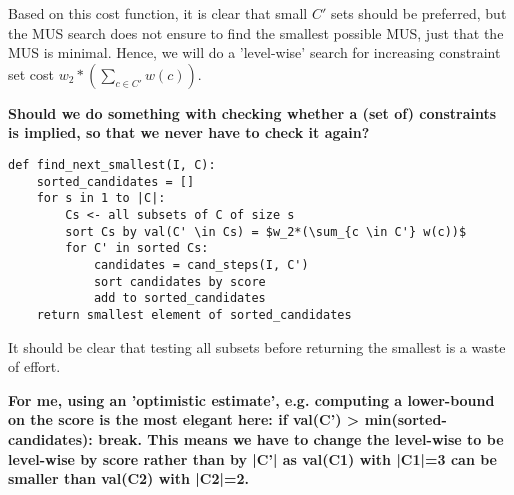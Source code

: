 Based on this cost function, it is clear that small $C'$ sets should be preferred, but the MUS search does not ensure to find the smallest possible MUS, just that the MUS is minimal. Hence, we will do a 'level-wise' search for increasing constraint set cost $w_2*(\sum_{c \in C'} w(c))$.

\textbf{Should we do something with checking whether a (set of) constraints is implied, so that we never have to check it again?}

\begin{verbatim}
def find_next_smallest(I, C):
	sorted_candidates = []
	for s in 1 to |C|:
		Cs <- all subsets of C of size s
		sort Cs by val(C' \in Cs) = $w_2*(\sum_{c \in C'} w(c))$
		for C' in sorted Cs:
			candidates = cand_steps(I, C')
			sort candidates by score
			add to sorted_candidates
	return smallest element of sorted_candidates
\end{verbatim}

It should be clear that testing all subsets before returning the smallest is a waste of effort.

\textbf{For me, using an 'optimistic estimate', e.g. computing a lower-bound on the score is the most elegant here: if val(C') > min(sorted-candidates): break. This means we have to change the level-wise to be level-wise by score rather than by |C'| as val(C1) with |C1|=3 can be smaller than val(C2) with |C2|=2.}



%
%
%	
%
%
%
%

